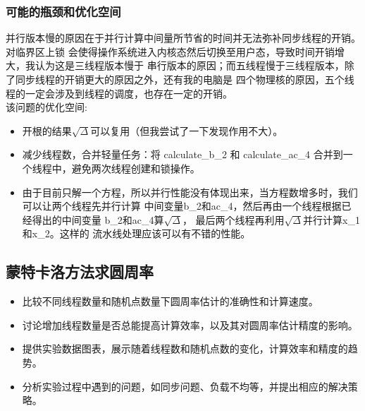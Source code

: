\documentclass{SYSUReport}
\begin{document}
\subsubsection{可能的瓶颈和优化空间}
并行版本慢的原因在于并行计算中间量所节省的时间并无法弥补同步线程的开销。对临界区上锁
会使得操作系统进入内核态然后切换至用户态，导致时间开销增大，我认为这是三线程版本慢于
串行版本的原因；而五线程慢于三线程版本，除了同步线程的开销更大的原因之外，还有我的电脑是
四个物理核的原因，五个线程的一定会涉及到线程的调度，也存在一定的开销。\\
该问题的优化空间:\\
\begin{itemize}
    \item 开根的结果$\sqrt{\Delta}$可以复用（但我尝试了一下发现作用不大）。
    \item 减少线程数，合并轻量任务：将 calculate\_b\_2 和 calculate\_ac\_4 合并到一个线程中，避免两次线程创建和锁操作。
    \item 由于目前只解一个方程，所以并行性能没有体现出来，当方程数增多时，我们可以让两个线程先并行计算
        中间变量b\_2和ac\_4，然后再由一个线程根据已经得出的中间变量
        b\_2和ac\_4算$\sqrt{\Delta}$，
        最后两个线程再利用$\sqrt{\Delta}$并行计算x\_1和x\_2。这样的
        流水线处理应该可以有不错的性能。
\end{itemize}
\subsection{蒙特卡洛方法求圆周率}

\begin{itemize}
\item 比较不同线程数量和随机点数量下圆周率估计的准确性和计算速度。
\item 讨论增加线程数量是否总能提高计算效率，以及其对圆周率估计精度的影响。
\item 提供实验数据图表，展示随着线程数和随机点数的变化，计算效率和精度的趋势。
\item 分析实验过程中遇到的问题，如同步问题、负载不均等，并提出相应的解决策略。
\end{itemize}
\end{document}
